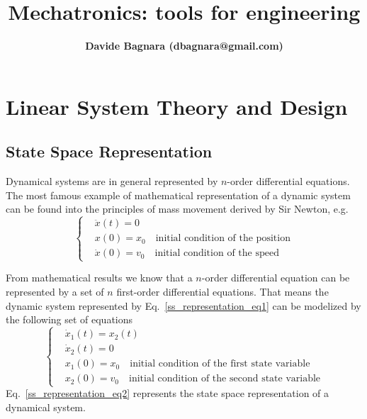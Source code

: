 \documentclass[11pt,a4paper,oneside]{book}
\title{\textbf{Mechatronics: tools for engineering}}
\author{\textbf{Davide Bagnara (dbagnara@gmail.com)}}
\numberwithin{equation}{section}
\theoremstyle{it}
\theoremstyle{definition}
\begin{document}
	\thispagestyle{firstpage}
	\begin{mybox}
		\maketitle
		\vspace{125mm}
	\end{mybox}
	\newpage
	\tableofcontents
	\listoffigures	
	\listoftables
	\newpage
	
\onehalfspace
\chapter{Linear System Theory and Design}
\section{State Space Representation}
Dynamical systems are in general represented by $n$-order differential 
equations. 
The most famous example of mathematical representation of a dynamic system can 
be found into the principles of mass movement derived by Sir Newton, e.g.
\begin{equation}\label{ss_representation_eq1}
	\left\lbrace \begin{aligned}
		&\ddot{x}(t)=0 \\[6pt]
		&x(0)=x_0\quad\text{initial condition of the position} \\[6pt]		
		&\dot{x}(0)=v_0\quad\text{initial condition of the speed}
	\end{aligned}\right. 
\end{equation} 

From mathematical results we know that a $n$-order differential equation can be 
represented by a set of $n$ first-order differential equations. That means the 
dynamic system represented by Eq.~\eqref{ss_representation_eq1} can be  
modelized by the following set of equations
\begin{equation}\label{ss_representation_eq2}
	\left\lbrace \begin{aligned}
		&\dot{x}_1(t)=x_2(t) \\[6pt]
		&\dot{x}_2(t)=0 \\[6pt]
		&x_1(0)=x_0\quad\text{initial condition of the first state variable} \\[6pt]		
		&x_2(0)=v_0\quad\text{initial condition of the second state variable}
	\end{aligned}\right. 
\end{equation} 
Eq.~\eqref{ss_representation_eq2} represents the state space representation of 
a dynamical system. 
\end{document}
